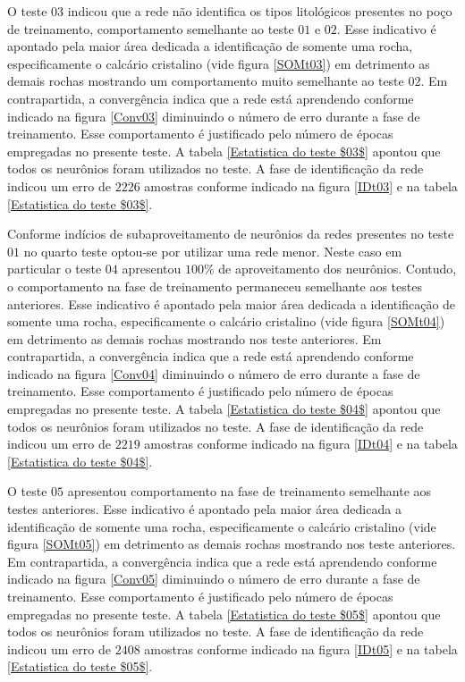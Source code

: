 O teste $03$ indicou que a rede não identifica os tipos litológicos presentes no poço de treinamento, comportamento semelhante ao teste $01$ e $02$. Esse indicativo é apontado pela maior área dedicada a identificação de somente uma rocha, especificamente o calcário cristalino (vide figura \ref{SOMt03}) em detrimento as demais rochas mostrando um comportamento muito semelhante ao teste $02$. Em contrapartida, a convergência indica que a rede está aprendendo conforme indicado na figura \ref{Conv03} diminuindo o número de erro durante a fase de treinamento. Esse comportamento é justificado pelo número de épocas empregadas no presente teste. A tabela \ref{Estatistica do teste $03$} apontou que todos os neurônios foram utilizados no teste. A fase de identificação da rede indicou um erro de $2226$ amostras conforme indicado na figura \ref{IDt03} e na tabela \ref{Estatistica do teste $03$}.

Conforme indícios de subaproveitamento de neurônios da redes presentes no teste $01$ no quarto teste optou-se por utilizar uma rede menor. Neste caso em particular o teste $04$ apresentou $100\%$ de aproveitamento dos neurônios. Contudo, o comportamento na fase de treinamento permaneceu semelhante aos testes anteriores. Esse indicativo é apontado pela maior área dedicada a identificação de somente uma rocha, especificamente o calcário cristalino (vide figura \ref{SOMt04}) em detrimento as demais rochas mostrando nos teste anteriores. Em contrapartida, a convergência indica que a rede está aprendendo conforme indicado na figura \ref{Conv04} diminuindo o número de erro durante a fase de treinamento. Esse comportamento é justificado pelo número de épocas empregadas no presente teste. A tabela \ref{Estatistica do teste $04$} apontou que todos os neurônios foram utilizados no teste. A fase de identificação da rede indicou um erro de $2219$ amostras conforme indicado na figura \ref{IDt04} e na tabela \ref{Estatistica do teste $04$}.

O teste $05$ apresentou comportamento na fase de treinamento semelhante aos testes anteriores. Esse indicativo é apontado pela maior área dedicada a identificação de somente uma rocha, especificamente o calcário cristalino (vide figura \ref{SOMt05}) em detrimento as demais rochas mostrando nos teste anteriores. Em contrapartida, a convergência indica que a rede está aprendendo conforme indicado na figura \ref{Conv05} diminuindo o número de erro durante a fase de treinamento. Esse comportamento é justificado pelo número de épocas empregadas no presente teste. A tabela \ref{Estatistica do teste $05$} apontou que todos os neurônios foram utilizados no teste. A fase de identificação da rede indicou um erro de $2408$ amostras conforme indicado na figura \ref{IDt05} e na tabela \ref{Estatistica do teste $05$}.

